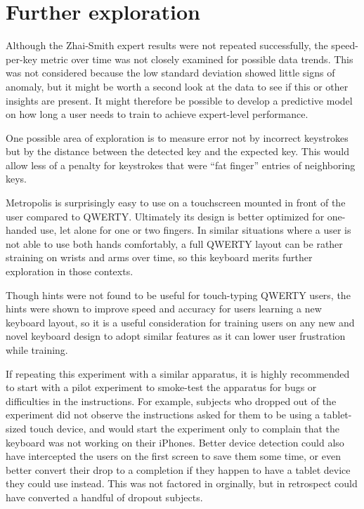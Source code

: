 \documentclass[english]{vgtc}
\begin{document}
\section{Further exploration}
Although the Zhai-Smith expert results were not repeated successfully, the speed-per-key metric over time was not closely examined for possible data trends.  This was not considered because the low standard deviation showed little signs of anomaly, but it might be worth a second look at the data to see if this or other insights are present. It might therefore be possible to develop a predictive model on how long a user needs to train to achieve expert-level performance.

One possible area of exploration is to measure error not by incorrect 
keystrokes but by the distance between the detected key and the expected key. \cite{Jain11} 
This would allow less of a penalty for keystrokes that were \textquotedblleft fat
finger\textquotedblright{} entries of neighboring keys.

Metropolis is surprisingly easy to use on a touchscreen mounted in front of the user compared to QWERTY. Ultimately its design is better optimized for one-handed use, let alone for one or two fingers.  In similar situations where a user is not able to use both hands comfortably, a full QWERTY layout can be rather straining on wrists and arms over time, so this keyboard merits further exploration in those contexts.

Though hints were not found to be useful for touch-typing QWERTY users, the hints were shown to improve speed and accuracy for users learning a new keyboard layout, so it is a useful consideration for training users on any new and novel keyboard design to adopt similar features as it can lower user frustration while training.

If repeating this experiment with a similar apparatus, it is highly recommended to start with a pilot experiment to smoke-test the apparatus for bugs or difficulties in the instructions.  For example, subjects who dropped out of the experiment did not observe the instructions asked for them to be using a tablet-sized touch device, and would start the experiment only to complain that the keyboard was not working on their iPhones.  Better device detection could also have intercepted the users on the first screen to save them some time, or even better convert their drop to a completion if they happen to have a tablet device they could use instead.  This was not factored in orginally, but in retrospect could have converted a handful of dropout subjects.



\end{document}
